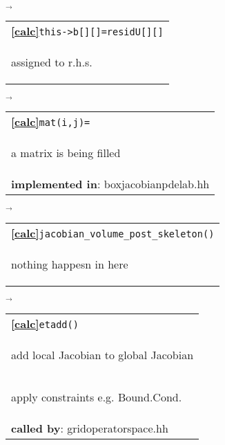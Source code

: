 \begin{landscape}
{    $\overrightarrow{
    }$
    \begin{tabular}{|l|}
      \hline
      \textbf{\textcircled{\ref{calc}}}\verb+this->b[][]=residU[][]+ \\
    \begin{scriptsize}assigned to r.h.s.\end{scriptsize}\\\hline 
  \end{tabular}
    $\overrightarrow{
    }$
      \begin{tabular}{|l|}
      \hline
      	\textbf{\textcircled{\ref{calc}}}\verb+mat(i,j)=+ \\
	\begin{scriptsize}a matrix is being filled\end{scriptsize}\\
      	\textbf{implemented in}: boxjacobianpdelab.hh\\  
      \hline 
      \end{tabular}
    \nextline
    $\overrightarrow{
    }$
      \begin{tabular}{|l|}
      \hline
      \textbf{\textcircled{\ref{calc}}}\verb+jacobian_volume_post_skeleton()+ \\
      \begin{scriptsize}nothing happesn in here\end{scriptsize}\\
      \hline 
  \end{tabular}
    $\overrightarrow{
    }$
      \begin{tabular}{|l|}
      \hline
      \textbf{\textcircled{\ref{calc}}}\verb+etadd()+ \\
     \begin{scriptsize}add local Jacobian to global Jacobian\end{scriptsize}\\
     \begin{scriptsize}apply constraints e.g. Bound.Cond.\end{scriptsize}\\	\textbf{called by}: gridoperatorspace.hh\\

\end{tabular}}
\end{landscape}
